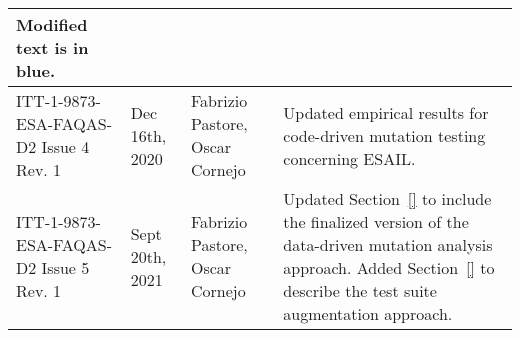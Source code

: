 \begin{longtable}{|p{2cm}|p{1cm}|p{1.5cm}|p{9cm}|@{}}
\begin{minipage}{8cm}
Modified text is in blue.
\end{minipage}

\\
\hline


ITT-1-9873-ESA-FAQAS-D2
Issue 4 Rev. 1
&Dec 16th, 2020
&Fabrizio Pastore, Oscar Cornejo
&
\begin{minipage}{8cm}
Updated empirical results for code-driven mutation testing concerning ESAIL.
\end{minipage}
\\

\hline

ITT-1-9873-ESA-FAQAS-D2
Issue 5 Rev. 1
&Sept 20th, 2021
&Fabrizio Pastore, Oscar Cornejo
&
\begin{minipage}{8cm}
Updated Section~\ref{} to include the finalized version of the data-driven mutation analysis approach.
Added Section~\ref{} to describe the test suite augmentation approach.
\end{minipage}
\\

\hline
                                                    
\end{longtable}
\normalsize

\clearpage